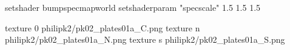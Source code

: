 setshader bumpspecmapworld
setshaderparam "specscale" 1.5 1.5 1.5

texture 0 philipk2/pk02_plates01a_C.png
texture n philipk2/pk02_plates01a_N.png
texture s philipk2/pk02_plates01a_S.png

